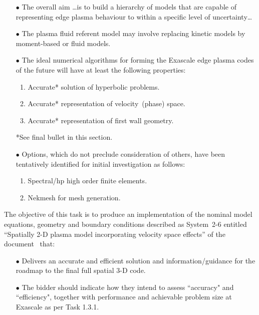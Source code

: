 \begin{itemize}
\begin{itemize}
\item[$\bullet$] The overall aim \ldots is to build a hierarchy of models that are capable of 
representing edge plasma behaviour to within a specific level of uncertainty\ldots 

\item[$\bullet$] The plasma fluid referent model may involve replacing kinetic models by 
moment-based or fluid models. 

\item[$\bullet$] The ideal numerical algorithms for forming the Exascale edge plasma codes 
of the future will have at least the following properties: 

\begin{enumerate}
\item Accurate* solution of hyperbolic problems. 
\item Accurate* representation of velocity~(phase) space. 
\item Accurate* representation of first wall geometry. 
\end{enumerate}
*See final bullet in this section.

\item[$\bullet$] Options, which do not preclude consideration of others, have been tentatively 
identified for initial investigation as follows: 

\begin{enumerate}
\item Spectral/hp high order finite elements. 
\item Nekmesh for mesh generation.
\end{enumerate}
\end{itemize}

The objective of this task is to produce an implementation of the nominal model 
equations, geometry and boundary conditions described as System~2-6 entitled 
``Spatially 2-D plasma model incorporating velocity space effects'' of the
document~\cite{pappeqs} that: 

\begin{itemize}
\item[$\bullet$] Delivers an accurate and efficient solution and information/guidance for 
the roadmap to the final full spatial 3-D code. 

\item[$\bullet$] The bidder should indicate how they intend to assess ``accuracy" and ``efficiency",
together with performance and achievable problem size at Exascale as per Task 1.3.1.
\end{itemize}

\end{itemize}

